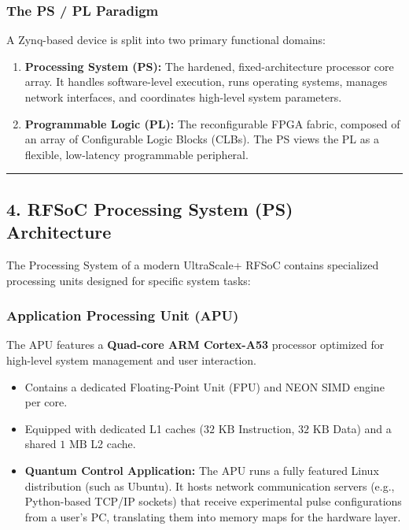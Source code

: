 \documentclass[
]{article}
\providecommand{\tightlist}{%
  \setlength{\itemsep}{0pt}\setlength{\parskip}{0pt}}
\begin{document}
\subsubsection{The PS / PL Paradigm}\label{the-ps-pl-paradigm}

A Zynq-based device is split into two primary functional domains:

\begin{enumerate}
\def\labelenumi{\arabic{enumi}.}
\tightlist
\item
  \textbf{Processing System (PS):} The hardened, fixed-architecture
  processor core array. It handles software-level execution, runs
  operating systems, manages network interfaces, and coordinates
  high-level system parameters.
\item
  \textbf{Programmable Logic (PL):} The reconfigurable FPGA fabric,
  composed of an array of Configurable Logic Blocks (CLBs). The PS views
  the PL as a flexible, low-latency programmable peripheral.
\end{enumerate}

\begin{center}\rule{0.5\linewidth}{0.5pt}\end{center}

\subsection{4. RFSoC Processing System (PS)
Architecture}\label{rfsoc-processing-system-ps-architecture}

The Processing System of a modern UltraScale+ RFSoC contains specialized
processing units designed for specific system tasks:

\subsubsection{Application Processing Unit
(APU)}\label{application-processing-unit-apu}

The APU features a \textbf{Quad-core ARM Cortex-A53} processor optimized
for high-level system management and user interaction.

\begin{itemize}
\tightlist
\item
  Contains a dedicated Floating-Point Unit (FPU) and NEON SIMD engine
  per core.
\item
  Equipped with dedicated L1 caches (\(32\text{ KB}\) Instruction,
  \(32\text{ KB}\) Data) and a shared \(1\text{ MB}\) L2 cache.
\item
  \textbf{Quantum Control Application:} The APU runs a fully featured
  Linux distribution (such as Ubuntu). It hosts network communication
  servers (e.g., Python-based TCP/IP sockets) that receive experimental
  pulse configurations from a user's PC, translating them into memory
  maps for the hardware layer.
\end{itemize}
\end{document}
